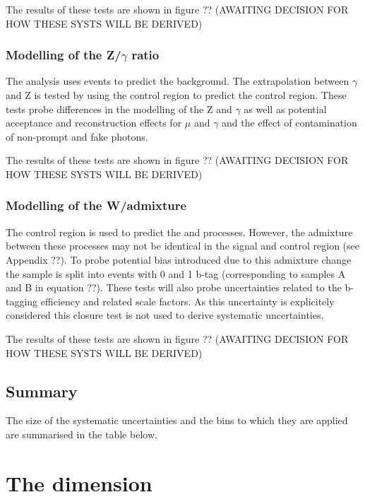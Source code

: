 The results of these tests are shown in figure ?? (AWAITING DECISION FOR HOW THESE SYSTS WILL BE DERIVED)
\subsubsection{Modelling of the Z/$\gamma$ ratio}

The \alphat analysis uses \gj events to predict the \znunu background. The extrapolation 
between $\gamma$ and Z is tested by using the \gj control region to predict the \mmj control region.
These tests probe differences in the modelling of the Z and $\gamma$ as well as potential acceptance and
reconstruction effects for $\mu$ and $\gamma$ and the effect of contamination of non-prompt and fake photons.

The results of these tests are shown in figure ?? (AWAITING DECISION FOR HOW THESE SYSTS WILL BE DERIVED)

\subsubsection{Modelling of the W/\ttbar admixture}

The \mj control region is used to predict the \wj and \ttbar processes. However, the admixture
between these processes may not be identical in the signal and control region (see Appendix ??).
To probe potential bias introduced due to this admixture change the sample is split into events with
0 and 1 b-tag (corresponding to samples A and B in equation ??). These tests will also probe 
uncertainties related to the b-tagging efficiency and related scale factors. As this uncertainty 
is explicitely considered this closure test is not used to derive systematic uncertainties.

The results of these tests are shown in figure ?? (AWAITING DECISION FOR HOW THESE SYSTS WILL BE DERIVED)

\subsection{Summary}

The size of the systematic uncertainties and the bins to which they are applied
are summarised in the table below.

\section{The \mht dimension}
\label{sec:syst-on-shape}

